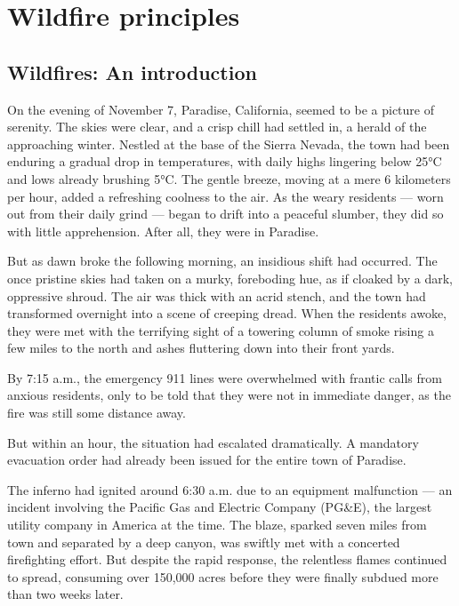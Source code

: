 \documentclass[
  12 pt,
]{Nemilov}
\begin{document}
\mainmatter

\part{Wildfire principles}\label{part-wildfire-principles}

\chapter{Wildfires: An introduction}\label{wildfires-an-introduction}

On the evening of November 7, Paradise, California, seemed to be a picture of serenity. The skies were clear, and a crisp chill had settled in, a herald of the approaching winter. Nestled at the base of the Sierra Nevada, the town had been enduring a gradual drop in temperatures, with daily highs lingering below 25°C and lows already brushing 5°C. The gentle breeze, moving at a mere 6 kilometers per hour, added a refreshing coolness to the air. As the weary residents --- worn out from their daily grind --- began to drift into a peaceful slumber, they did so with little apprehension. After all, they were in Paradise.

But as dawn broke the following morning, an insidious shift had occurred. The once pristine skies had taken on a murky, foreboding hue, as if cloaked by a dark, oppressive shroud. The air was thick with an acrid stench, and the town had transformed overnight into a scene of creeping dread. When the residents awoke, they were met with the terrifying sight of a towering column of smoke rising a few miles to the north and ashes fluttering down into their front yards.

By 7:15 a.m., the emergency 911 lines were overwhelmed with frantic calls from anxious residents, only to be told that they were not in immediate danger, as the fire was still some distance away.

But within an hour, the situation had escalated dramatically. A mandatory evacuation order had already been issued for the entire town of Paradise.

The inferno had ignited around 6:30 a.m. due to an equipment malfunction --- an incident involving the Pacific Gas and Electric Company (PG\&E), the largest utility company in America at the time. The blaze, sparked seven miles from town and separated by a deep canyon, was swiftly met with a concerted firefighting effort. But despite the rapid response, the relentless flames continued to spread, consuming over 150,000 acres before they were finally subdued more than two weeks later.
\end{document}
